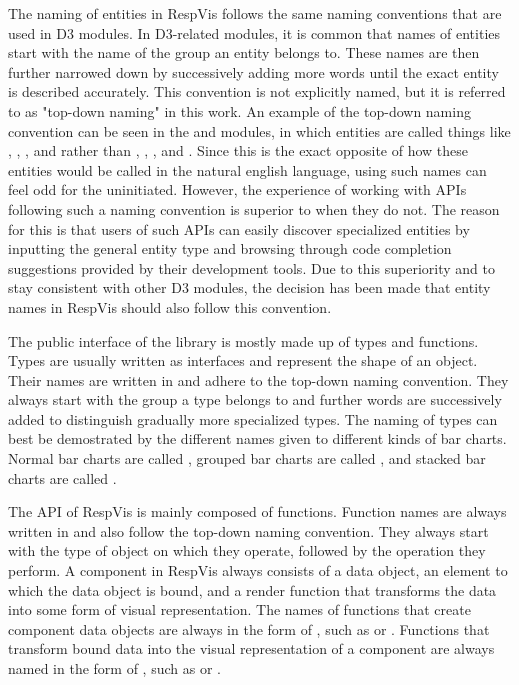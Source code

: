 The naming of entities in RespVis follows the same naming conventions that are used in D3 modules.
In D3-related modules, it is common that names of entities start with the name of the group an entity belongs to.
These names are then further narrowed down by successively adding more words until the exact entity is described accurately.
This convention is not explicitly named, but it is referred to as "top-down naming" in this work.
An example of the top-down naming convention can be seen in the  \parencite{D3Scale} and  \parencite{D3Axis} modules, in which entities are called things like , , , and  rather than , , , and .
Since this is the exact opposite of how these entities would be called in the natural english language, using such names can feel odd for the uninitiated. 
However, the experience of working with APIs following such a naming convention is superior to when they do not.
The reason for this is that users of such APIs can easily discover specialized entities by inputting the general entity type and browsing through code completion suggestions provided by their development tools.
Due to this superiority and to stay consistent with other D3 modules, the decision has been made that entity names in RespVis should also follow this convention.

The public interface of the library is mostly made up of types and functions.
Types are usually written as interfaces and represent the shape of an object. 
Their names are written in  and adhere to the top-down naming convention.
They always start with the group a type belongs to and further words are successively added to distinguish gradually more specialized types.
The naming of types can best be demostrated by the different names given to different kinds of bar charts.
Normal bar charts are called , grouped bar charts are called , and stacked bar charts are called .

The API of RespVis is mainly composed of functions.
Function names are always written in  and also follow the top-down naming convention.
They always start with the type of object on which they operate, followed by the operation they perform.
A component in RespVis always consists of a data object, an element to which the data object is bound, and a render function that transforms the data into some form of visual representation.
The names of functions that create component data objects are always in the form of , such as  or .
Functions that transform bound data into the visual representation of a component are always named in the form of , such as  or . 


